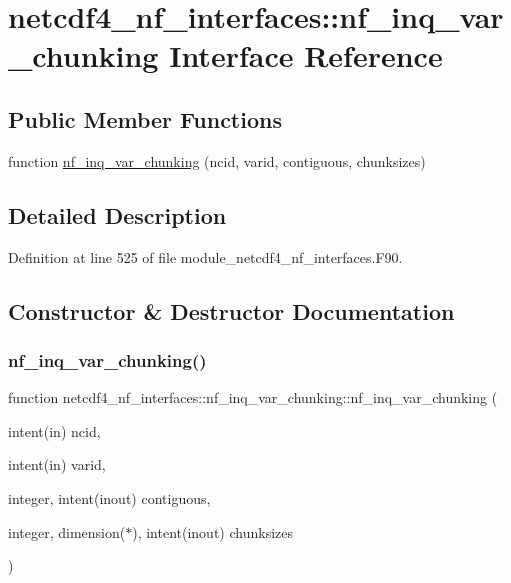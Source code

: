 \hypertarget{interfacenetcdf4__nf__interfaces_1_1nf__inq__var__chunking}{}\section{netcdf4\+\_\+nf\+\_\+interfaces\+:\+:nf\+\_\+inq\+\_\+var\+\_\+chunking Interface Reference}
\label{interfacenetcdf4__nf__interfaces_1_1nf__inq__var__chunking}
\subsection*{Public Member Functions}
\begin{DoxyCompactItemize}
\item 
function \hyperlink{interfacenetcdf4__nf__interfaces_1_1nf__inq__var__chunking_a1e358acfdac4d531ca2f128a11934cf7}{nf\+\_\+inq\+\_\+var\+\_\+chunking} (ncid, varid, contiguous, chunksizes)
\end{DoxyCompactItemize}


\subsection{Detailed Description}


Definition at line 525 of file module\+\_\+netcdf4\+\_\+nf\+\_\+interfaces.\+F90.



\subsection{Constructor \& Destructor Documentation}
\mbox{\label{interfacenetcdf4__nf__interfaces_1_1nf__inq__var__chunking_a1e358acfdac4d531ca2f128a11934cf7}} 
\subsubsection{\texorpdfstring{nf\+\_\+inq\+\_\+var\+\_\+chunking()}{nf\_inq\_var\_chunking()}}
{\footnotesize\ttfamily function netcdf4\+\_\+nf\+\_\+interfaces\+::nf\+\_\+inq\+\_\+var\+\_\+chunking\+::nf\+\_\+inq\+\_\+var\+\_\+chunking (\begin{DoxyParamCaption}\item[{intent(in)}]{ncid,  }\item[{intent(in)}]{varid,  }\item[{integer, intent(inout)}]{contiguous,  }\item[{integer, dimension($\ast$), intent(inout)}]{chunksizes }\end{DoxyParamCaption})}



